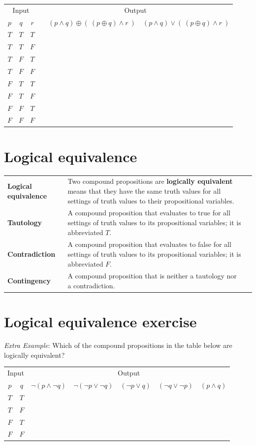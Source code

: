 \documentclass[12pt, oneside]{article}
\begin{document}
\begin{center}
    \begin{tabular}{ccc||p{3in}|c|c}
    \multicolumn{3}{c||}{Input}  & \multicolumn{3}{c}{Output} \\
    $p$ & $q$ & $r$  &  &  $(p \land q) \oplus (~ ( p \oplus q) \land r~)$ & $(p \land q) \vee (~ ( p \oplus q) \land r~)$ \\
    \hline
    $T$ & $T$  & $T$ &   && \\
    $T$ & $T$  & $F$ &   && \\
    $T$ & $F$  & $T$ &   && \\
    $T$ & $F$  & $F$ &   && \\
    $F$ & $T$  & $T$ &   && \\
    $F$ & $T$  & $F$ &   && \\
    $F$ & $F$  & $T$ &   && \\
    $F$ & $F$  & $F$ &   && \\
    \end{tabular}
\end{center}
    \vfill \vfill
\section*{Logical equivalence}


\begin{tabular}{lp{4in}p{2in}}
{\bf Logical equivalence } &Two compound  propositions are {\bf logically  equivalent} means that  they 
have the  same  truth  values for all settings of truth  values to their propositional  variables.\\
{\bf Tautology} & A compound proposition that evaluates to true
for all settings of truth  values to its propositional  variables; it is  abbreviated $T$.\\
{\bf Contradiction} & A compound proposition that  evaluates  to  false 
for  all settings of truth  values to its propositional  variables; it  is abbreviated $F$.\\
{\bf Contingency} & A compound proposition that is neither a tautology nor a contradiction.\\
\end{tabular}
 \vfill
\section*{Logical equivalence exercise}


{\it Extra Example}: Which of the  compound propositions in the table below are logically equivalent?
\begin{center}
\begin{tabular}{cc||c|c|c|c|c}
\multicolumn{2}{c||}{Input}  & \multicolumn{5}{c}{Output} \\
$p$ & $q$ & $\lnot (p \land \lnot q)$ & $\lnot (\lnot p  \lor \lnot q)$ &  $(\lnot p \lor  q)$
& $(\lnot q \lor \lnot p)$ & $(p \land q)$  \\
\hline
$T$ & $T$ & &&&&\\
$T$ & $F$ & &&&&\\
$F$ & $T$ & &&&&\\
$F$ & $F$ & &&&&\\
\end{tabular}
\end{center} \vfill
\end{document}
